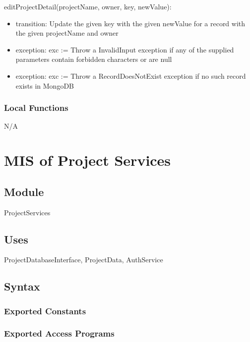 \documentclass[12pt, titlepage]{article}
\begin{document}
	\noindent editProjectDetail(projectName, owner, key, newValue):
	\begin{itemize}
		\item transition: Update the given key with the given newValue for a record with the given projectName and owner
		
		\item exception: exc := Throw a InvalidInput exception if any of the supplied parameters contain forbidden characters or are null
		\item exception: exc := Throw a RecordDoesNotExist exception if no such record exists in MongoDB
	\end{itemize}
	
	\subsubsection{Local Functions}
	
	N/A
	
	\newpage
	
	\section{MIS of Project Services} \label{Module} 
	
	\subsection{Module}
	
	ProjectServices
	
	\subsection{Uses}
	ProjectDatabaseInterface, ProjectData, AuthService
	
	\subsection{Syntax}
	
	\subsubsection{Exported Constants}
	
	\subsubsection{Exported Access Programs}
	
\end{document}

